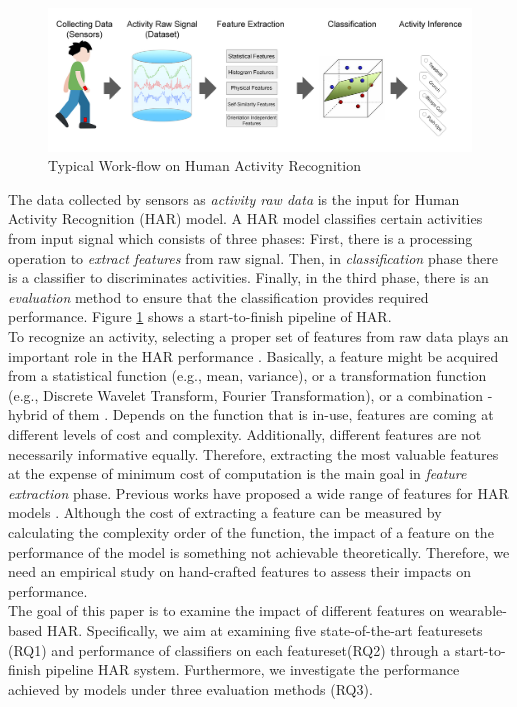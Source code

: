 \documentclass[journal,article,submit,moreauthors,pdftex]{Definitions/mdpi}
\begin{document}
\begin{figure}[H]
	\centering
	\includegraphics[width=14 cm]{Definitions/images/main_approach.jpg}
	\caption{Typical Work-flow on Human Activity Recognition}
	\label{fig:main_approach}
\end{figure} 
The data collected by sensors as \textit{activity raw data} is the input for Human Activity Recognition (HAR) model\cite{rosati2018comparison}. A HAR model classifies certain activities from input signal which consists of three phases: First, there is a processing operation to \textit{extract features} from raw signal. Then, in \textit{classification }phase there is a classifier to discriminates activities. Finally, in the third phase, there is an \textit{evaluation} method to ensure that the classification provides required performance\cite{kolodziej2019registration}.  Figure \ref{fig:main_approach} shows a start-to-finish pipeline of HAR.\\

To recognize an activity, selecting a proper set of features from raw data plays an important role in the HAR performance \cite{zhang2013human}. Basically, a feature might be acquired from a statistical function (e.g., mean, variance), or a transformation function (e.g., Discrete Wavelet Transform, Fourier Transformation), or a combination - hybrid of them \cite{wang2019survey}. Depends on the function that is in-use, features are coming at different levels of cost and complexity. Additionally, different features are not necessarily informative equally. Therefore, extracting the most valuable features at the expense of minimum cost of computation is the main goal in \textit{feature extraction} phase. Previous works have proposed a wide range of features for HAR models \cite{janidarmian2017comprehensive, wang2019survey}. Although the cost of extracting a feature can be measured by calculating the complexity order of the function, the impact of a feature on the performance of the model is something not achievable theoretically\cite{rosati2018comparison}. Therefore, we need an empirical study on hand-crafted features to assess their impacts on performance.\\
The goal of this paper is to examine the impact of different features on wearable-based HAR. Specifically, we aim at examining five state-of-the-art featuresets (RQ1) and performance of classifiers on each featureset(RQ2) through a start-to-finish pipeline HAR system. Furthermore, we investigate the performance achieved by models under three evaluation methods (RQ3).
\end{document}
